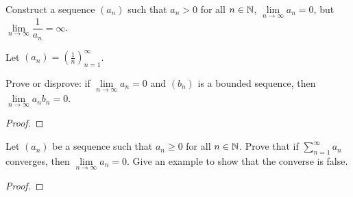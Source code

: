 \begin{problem}
  Construct a sequence $(a_{n})$ such that $a_{n} > 0$ for all $n \in \mathbb{N}$, $\lim\limits_{n \to \infty} a_{n} = 0$, but
  $\lim\limits_{n \to \infty} \dfrac{1}{a_{n}} = \infty$.

  \vspace{\baselineskip}

    Let $(a_{n}) = \left( \frac{1}{n} \right)_{n=1}^{\infty}$.

\end{problem}

\begin{problem}
  Prove or disprove: if $\lim\limits_{n \to \infty} a_{n} = 0$ and $(b_{n})$ is a bounded sequence,
  then $\lim\limits_{n \to \infty} a_{n}b_{n} = 0$.

  \begin{proof} 
  \end{proof}

\end{problem}


\begin{problem}
  Let $(a_{n})$ be a sequence such that $a_{n} \geq 0$ for all $n \in \mathbb{N}$. 
  Prove that if $\sum\limits_{n=1}^{\infty} a_{n}$ converges, then
  $\lim\limits_{n \to \infty} a_{n} = 0$. Give an example to show that the 
  converse is false.

  \begin{proof} 
  \end{proof}

\end{problem}
